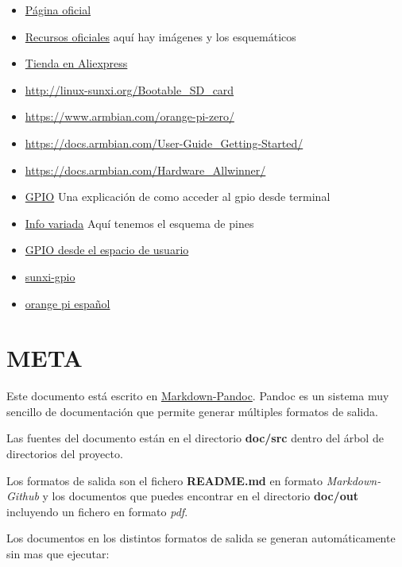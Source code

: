 \documentclass[12pt,spanish,]{scrartcl}
\providecommand{\tightlist}{%
  \setlength{\itemsep}{0pt}\setlength{\parskip}{0pt}}
\begin{document}
\begin{itemize}
\tightlist
\item
  \href{http://www.orangepi.org/}{Página oficial}
\item
  \href{http://www.orangepi.org/downloadresources/}{Recursos oficiales}
  aquí hay imágenes y los esquemáticos
\item
  \href{https://www.aliexpress.com/store/1553371?spm=2114.8147860.0.0.F1q43C}{Tienda
  en Aliexpress}
\item
  \url{http://linux-sunxi.org/Bootable_SD_card}
\item
  \url{https://www.armbian.com/orange-pi-zero/}
\item
  \url{https://docs.armbian.com/User-Guide_Getting-Started/}
\item
  \url{https://docs.armbian.com/Hardware_Allwinner/}
\item
  \href{https://linux-sunxi.org/GPIO}{GPIO} Una explicación de como
  acceder al gpio desde terminal
\item
  \href{https://linux-sunxi.org/Orange_Pi_Zero}{Info variada} Aquí
  tenemos el esquema de pines
\item
  \href{https://forum.armbian.com/index.php/topic/1886-gpio-access-from-user-space/}{GPIO
  desde el espacio de usuario}
\item
  \href{https://forum.armbian.com/index.php/topic/1471-solved-difficulty-accessing-gpio-via-the-sunxi-gpio-export-interface/}{sunxi-gpio}
\item
  \href{http://orangepiweb.es/index.php}{orange pi español}
\end{itemize}

\section{META}\label{meta}

Este documento está escrito en
\href{http://pandoc.org/README.html}{Markdown-Pandoc}. Pandoc es un
sistema muy sencillo de documentación que permite generar múltiples
formatos de salida.

Las fuentes del documento están en el directorio \textbf{doc/src} dentro
del árbol de directorios del proyecto.

Los formatos de salida son el fichero \textbf{README.md} en formato
\emph{Markdown-Github} y los documentos que puedes encontrar en el
directorio \textbf{doc/out} incluyendo un fichero en formato \emph{pdf}.

Los documentos en los distintos formatos de salida se generan
automáticamente sin mas que ejecutar:
\end{document}
